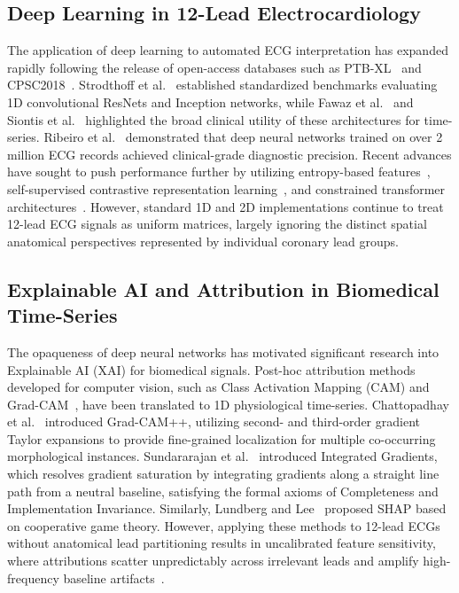 \documentclass[12pt]{elsarticle}
\begin{document}
\subsection{Deep Learning in 12-Lead Electrocardiology}
The application of deep learning to automated ECG interpretation has expanded rapidly following the release of open-access databases such as PTB-XL~\cite{wagner2020ptb} and CPSC2018~\cite{liu2018open}. Strodthoff et al.~\cite{strodthoff2020deep} established standardized benchmarks evaluating 1D convolutional ResNets and Inception networks, while Fawaz et al.~\cite{fawaz2019deep} and Siontis et al.~\cite{siontis2021artificial} highlighted the broad clinical utility of these architectures for time-series. Ribeiro et al.~\cite{ribeiro2020automatic} demonstrated that deep neural networks trained on over 2 million ECG records achieved clinical-grade diagnostic precision. Recent advances have sought to push performance further by utilizing entropy-based features~\cite{smigiel2021ecg}, self-supervised contrastive representation learning~\cite{mehari2022self}, and constrained transformer architectures~\cite{che2021constrained}. However, standard 1D and 2D implementations continue to treat 12-lead ECG signals as uniform matrices, largely ignoring the distinct spatial anatomical perspectives represented by individual coronary lead groups.

\subsection{Explainable AI and Attribution in Biomedical Time-Series}
The opaqueness of deep neural networks has motivated significant research into Explainable AI (XAI) for biomedical signals. Post-hoc attribution methods developed for computer vision, such as Class Activation Mapping (CAM) and Grad-CAM~\cite{selvaraju2017grad}, have been translated to 1D physiological time-series. Chattopadhay et al.~\cite{chattopadhay2018grad} introduced Grad-CAM++, utilizing second- and third-order gradient Taylor expansions to provide fine-grained localization for multiple co-occurring morphological instances. Sundararajan et al.~\cite{sundararajan2017axiomatic} introduced Integrated Gradients, which resolves gradient saturation by integrating gradients along a straight line path from a neutral baseline, satisfying the formal axioms of Completeness and Implementation Invariance. Similarly, Lundberg and Lee~\cite{lundberg2017unified} proposed SHAP based on cooperative game theory. However, applying these methods to 12-lead ECGs without anatomical lead partitioning results in uncalibrated feature sensitivity, where attributions scatter unpredictably across irrelevant leads and amplify high-frequency baseline artifacts~\cite{ismail2020benchmarking, tonekaboni2020went}.
\end{document}
